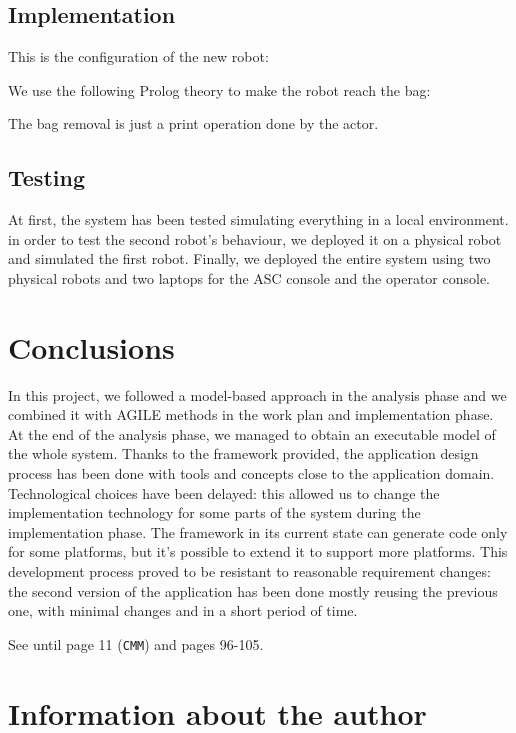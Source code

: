 \documentclass{llncs}
\newcommand{\labelsec}[1]{\label{sec:#1}}
\begin{document}
\subsection{Implementation}
This is the configuration of the new robot:

We use the following Prolog theory to make the robot reach the bag:

The bag removal is just a print operation done by the actor.
\subsection{Testing}
At first, the system has been tested simulating everything in a local environment. in order to test the second robot's behaviour, we deployed it on a physical robot and simulated the first robot. Finally, we deployed the entire system using two physical robots and two laptops for the ASC console and the operator console.
\section{Conclusions}
In this project, we followed a model-based approach in the analysis phase and we combined it with AGILE methods in the work plan and implementation phase. At the end of the analysis phase, we managed to obtain an executable model of the whole system. Thanks to the framework provided, the application design process has been done with tools and concepts close to the application domain. Technological choices have been delayed: this allowed us to change the implementation technology for some parts of the system during the implementation phase. The framework in its current state can generate code only for some platforms, but it's possible to extend it to support more platforms.
This development process proved to be resistant to reasonable requirement changes: the second version of the application has been done mostly reusing the previous one, with minimal changes and in a short period of time.

\newpage
See \cite{natMol09} until page 11 (\texttt{CMM}) and pages 96-105.

\section{Information about the author}
\labelsec{Author}
\end{document}
